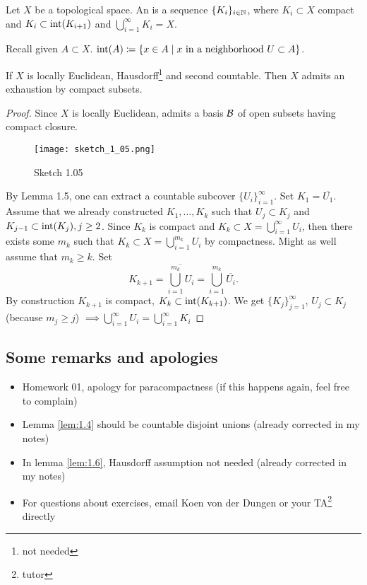\begin{definition*}
    Let \(X\) be a topological space. An  is a sequence \(\{K_i\}_{i\in\mathbb{N}}\),
    where \(K_i\subset X\) compact and \(K_i\subset \text{int}(K_{i+1})\) and \(\bigcup_{i=1}^\infty K_i=X\).
\end{definition*}

Recall given \(A\subset X\). \(\text{int}(A)\coloneqq \{x\in A\mid x \text{ in a neighborhood } U\subset A\}\).


\begin{lemma}\label{lem:1.6}
    If \(X\) is locally Euclidean, Hausdorff\footnote{not needed} and second countable. Then \(X\) admits an exhaustion by compact subsets.
\end{lemma}

\begin{proof}
    Since \(X\) is locally Euclidean, admits a basis \(\mathcal{B}\) of open subsets having compact closure.
    \begin{figure}[H]
        \centering
        \texttt{[image: sketch\_1\_05.png]}
        \caption{Sketch 1.05}
    \end{figure}
    By Lemma 1.5, one can extract a countable subcover \(\{U_i\}_{i=1}^\infty\). Set \(K_1=\overline{U_1}\).
    Assume that we already constructed \(K_1,\dots,K_k\) such that \(U_j\subset K_j\)
    and \(K_{j-1}\subset\text{int}(K_j),j\geq 2\). Since \(K_k\) is compact and \(K_k\subset X=\bigcup_{i=1}^\infty U_i\), then there exists some \(m_k\) such that 
    \(K_k\subset X=\bigcup_{i=1}^{m_k} U_i\) by compactness. Might as well assume that \(m_k\geq k\). Set 
    \[K_{k+1}=\overline{\bigcup_{i=1}^{m_k} U_i}=\bigcup_{i=1}^{m_k} \overline{U_i}.\] By construction \(K_{k+1}\) 
    is compact, \(K_k\subset \text{int}(K_{k+1})\). We get \(\{K_j\}_{j=1}^\infty\), \(U_j\subset K_j\) (because \(m_j\geq j\)) \(\implies \bigcup_{i=1}^\infty U_i=\bigcup_{i=1}^\infty K_i\)
\end{proof}
\subsection*{Some remarks and apologies}
\begin{itemize}
    \item Homework 01, apology for paracompactness (if this happens again, feel free to complain)
    \item Lemma \ref{lem:1.4} should be countable disjoint unions (already corrected in my notes)
    \item In lemma \ref{lem:1.6}, Hausdorff assumption not needed (already corrected in my notes)
    \item For questions about exercises, email Koen von der Dungen or your TA\footnote{tutor} directly
\end{itemize}

